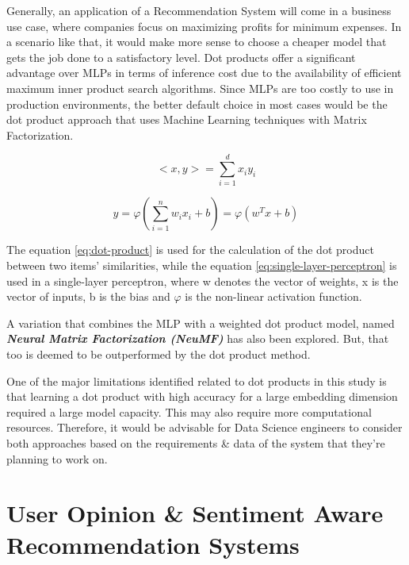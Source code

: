 \documentclass[manuscript,screen,review]{acmart}
\begin{document}
Generally, an application of a Recommendation System will come in a business use case, where companies focus on maximizing profits for minimum expenses. In a scenario like that, it would make more sense to choose a cheaper model that gets the job done to a satisfactory level. Dot products offer a significant advantage over MLPs in terms of inference cost due to the availability of efficient maximum inner product search algorithms. Since MLPs are too costly to use in production environments, the better default choice in most cases would be the dot product approach that uses Machine Learning techniques with Matrix Factorization.

\begin{equation}
<x,y>  = \sum_{i=1}^{d}x_{i}y_{i}\label{eq:dot-product}
\end{equation}

\begin{equation}
y = \varphi(\sum_{i=1}^{n}w_{i}x_{i}+b) = \varphi(w^{T}x+b)\label{eq:single-layer-perceptron}
\end{equation}

The equation \ref{eq:dot-product} is used for the calculation of the dot product between two items' similarities, while the equation \ref{eq:single-layer-perceptron} is used in a single-layer perceptron, where w denotes the vector of weights, x is the vector of inputs, b is the bias and $\varphi$ is the non-linear activation function.

A variation that combines the MLP with a weighted dot product model, named \textbf{\emph{Neural Matrix Factorization (NeuMF)}} has also been explored. But, that too is deemed to be outperformed by the dot product method.

One of the major limitations identified related to dot products in this study is that learning a dot product with high accuracy for a large embedding dimension required a large model capacity. This may also require more computational resources. Therefore, it would be advisable for Data Science engineers to consider both approaches based on the requirements \& data of the system that they're planning to work on.



\section{User Opinion \& Sentiment Aware Recommendation Systems}
\end{document}
